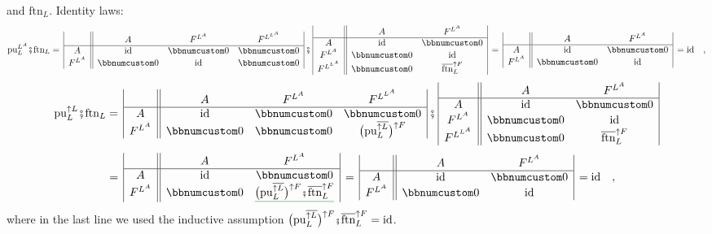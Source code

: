 and $\text{ftn}_{L}$. Identity laws:
\[
\text{pu}_{L}^{L^{A}}\bef\text{ftn}_{L}=\,\begin{array}{|c||ccc|}
 & A & F^{L^{A}} & F^{L^{L^{A}}}\\
\hline A & \text{id} & \bbnum 0 & \bbnum 0\\
F^{L^{A}} & \bbnum 0 & \text{id} & \bbnum 0
\end{array}\,\bef\,\begin{array}{|c||cc|}
 & A & F^{L^{A}}\\
\hline A & \text{id} & \bbnum 0\\
F^{L^{A}} & \bbnum 0 & \text{id}\\
F^{L^{L^{A}}} & \bbnum 0 & \overline{\text{ftn}}_{L}^{\uparrow F}
\end{array}\,=\,\begin{array}{|c||cc|}
 & A & F^{L^{A}}\\
\hline A & \text{id} & \bbnum 0\\
F^{L^{A}} & \bbnum 0 & \text{id}
\end{array}\,=\text{id}\quad,
\]
\[
\text{pu}_{L}^{\uparrow L}\bef\text{ftn}_{L}=\,\begin{array}{|c||ccc|}
 & A & F^{L^{A}} & F^{L^{L^{A}}}\\
\hline A & \text{id} & \bbnum 0 & \bbnum 0\\
F^{L^{A}} & \bbnum 0 & \bbnum 0 & \big(\text{pu}_{L}^{\overline{\uparrow L}}\big)^{\uparrow F}
\end{array}\,\bef\,\begin{array}{|c||cc|}
 & A & F^{L^{A}}\\
\hline A & \text{id} & \bbnum 0\\
F^{L^{A}} & \bbnum 0 & \text{id}\\
F^{L^{L^{A}}} & \bbnum 0 & \overline{\text{ftn}}_{L}^{\uparrow F}
\end{array}
\]
\[
\quad=\,\begin{array}{|c||cc|}
 & A & F^{L^{A}}\\
\hline A & \text{id} & \bbnum 0\\
F^{L^{A}} & \bbnum 0 & \gunderline{\big(\text{pu}_{L}^{\overline{\uparrow L}}\big)^{\uparrow F}\bef\overline{\text{ftn}}_{L}^{\uparrow F}}
\end{array}\,=\,\begin{array}{|c||cc|}
 & A & F^{L^{A}}\\
\hline A & \text{id} & \bbnum 0\\
F^{L^{A}} & \bbnum 0 & \text{id}
\end{array}\,=\text{id}\quad,
\]
where in the last line we used the inductive assumption $\big(\text{pu}_{L}^{\overline{\uparrow L}}\big)^{\uparrow F}\bef\overline{\text{ftn}}_{L}^{\uparrow F}=\text{id}$.

